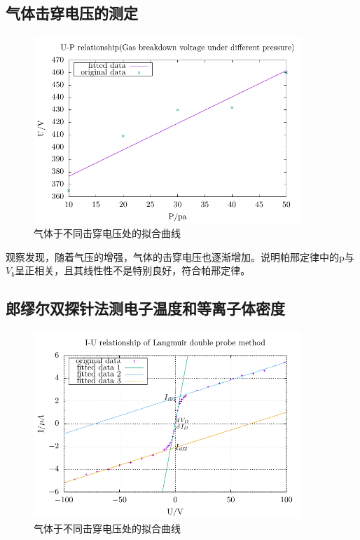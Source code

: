 \documentclass[a4paper,UTF8]{ctexart}
\begin{document}
\subsection{气体击穿电压的测定}

\begin{figure}[H]
    \centering
    \begin{minipage}[b]{0.9\textwidth}
        \centering
        \includegraphics[width=0.9\textwidth]{./pic2.pdf}
        \caption{气体于不同击穿电压处的拟合曲线}
    \end{minipage}
\end{figure}

观察发现，随着气压的增强，气体的击穿电压也逐渐增加。说明帕邢定律中的p与$V_b$呈正相关，且其线性性不是特别良好，符合帕邢定律。

\subsection{郎缪尔双探针法测电子温度和等离子体密度}

\begin{figure}[H]
    \centering
    \begin{minipage}[b]{0.9\textwidth}
        \centering
        \includegraphics[width=0.9\textwidth]{./pic3.pdf}
        \caption{气体于不同击穿电压处的拟合曲线}
    \end{minipage}
\end{figure}
\end{document}
